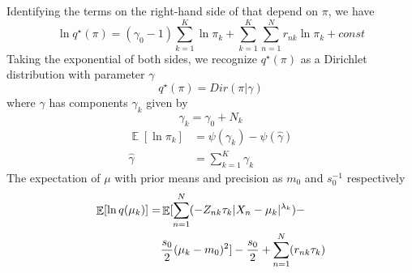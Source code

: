 \documentclass[conference]{IEEEtran}
\begin{document}
Identifying the terms on the right-hand side of that depend on $\pi$, we have \\
\begin{equation}
    \ln q^\star(\pi) = (\gamma_0 - 1)\sum_{k=1}^{K}\ln \pi_k + \sum_{k=1}^{K}\sum_{n=1}^{N} r_{nk} \ln \pi_k + const
\end{equation}
Taking the exponential of both sides, we recognize $q^\star(\pi)$ as a Dirichlet distribution with parameter $\gamma$
\begin{equation}
    q^\star(\pi) =  Dir(\pi|\gamma)
\end{equation}
where $\gamma$ has components $\gamma_k$ given by
\begin{equation}\label{gammak}
    \gamma_k = \gamma_0 + N_k
\end{equation}   
    \begin{equation}
        \begin{split}
            \mathop{\mathbb{E}}[\ln \pi_k] &= \psi(\gamma_k) - \psi(\hat{\gamma})\\
            \hat{\gamma} &= \sum_{k=1}^{K} \gamma_k
        \end{split}
    \end{equation}
    The expectation of $\mu$ with prior means and precision as $m_0$ and $ s_0^{-1}$ respectively
    \begin{align}
    \begin{split}
    \mathop{\mathbb{E}}[\ln q(\mu_k)] = &\mathop{\mathbb{E}}[\sum_{\mathclap{n=1}}^{N}(-Z_{nk}\tau_k|X_n - \mu_k|^{\lambda_k}) - \\
    &\frac{s_0}{2}(\mu_k - m_0)^2]
    -\frac{s_0}{2} + \sum_{\mathclap{n=1}}^{N}(r_{nk} \tau_k)
    \end{split}
    \end{align}
\end{document}
